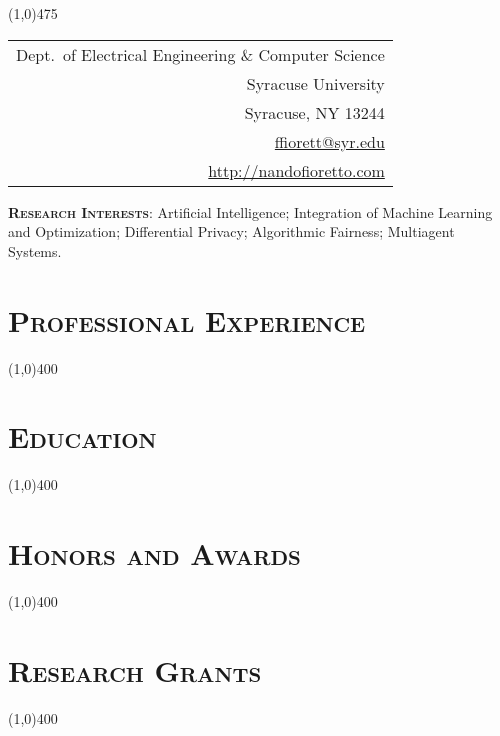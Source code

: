 \documentclass[10pt]{article}
\begin{document}
\thispagestyle{empty}

\vspace*{-0.50in}  \line(1,0){475}

\begin{tabular}[t]{r}
\hspace{3in} 
Dept.~of Electrical	Engineering	\& Computer Science\\
Syracuse University\\
Syracuse, NY 13244\\
\small{\url{ffiorett@syr.edu}}\\ 
\small{\url{http://nandofioretto.com}}
\end{tabular}

\noindent\textbf{\scshape Research Interests}: 
Artificial Intelligence;
Integration of Machine Learning and Optimization;
Differential Privacy;
Algorithmic Fairness;
Multiagent Systems.

\section*{\scshape Professional Experience}
\vspace{-14pt}\hspace{6pt}\line(1,0){400}


\section*{\scshape Education}
\vspace{-14pt}\hspace{6pt}\line(1,0){400}


\section*{\scshape Honors and Awards}
\vspace{-14pt}\hspace{6pt}\line(1,0){400}


\section*{\scshape Research Grants}
\vspace{-14pt}\hspace{6pt}\line(1,0){400}

\end{document}
